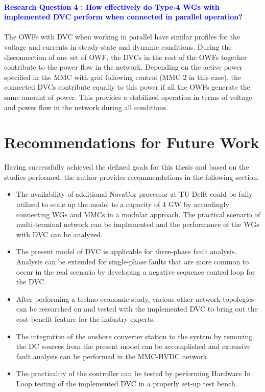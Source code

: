 \paragraph{\textcolor{blue}{Research Question 4 : How effectively do Type-4 \gls{WG}s with implemented \gls{DVC} perform when connected in parallel operation?}}

\paragraph{} The \gls{OWF}s with \gls{DVC} when working in parallel have similar profiles for the voltage and currents in steady-state and dynamic conditions. During the disconnection of one set of \gls{OWF}, the \gls{DVC}s in the rest of the \gls{OWF}s together contribute to the power flow in the network. Depending on the active power specified in the \gls{MMC} with grid following control (\gls{MMC}-2 in this case), the connected \gls{DVC}s contribute equally to this power if all the \gls{OWF}s generate the same amount of power. This provides a stabilized operation in terms of voltage and power flow in the network during all conditions.  

\section{Recommendations for Future Work}
Having successfully achieved the defined goals for this thesis and based on the studies performed, the author provides recommendations in the following section:  
\begin{itemize}
    \item The availability of additional NovaCor processor at TU Delft could be fully utilized to scale up the model to a capacity of 4 GW by accordingly connecting \gls{WG}s and \gls{MMC}s in a modular approach. The practical scenario of multi-terminal network can be implemented and the performance of the \gls{WG}s with \gls{DVC} can be analyzed.
    \item The present model of \gls{DVC} is applicable for three-phase fault analysis. Analysis can be extended for single-phase faults that are more common to occur in the real scenario by developing a negative sequence control loop for the \gls{DVC}.
    \item After performing a techno-economic study, various other network topologies can be researched on and tested with the implemented \gls{DVC} to bring out the cost-benefit feature for the industry experts. 
    \item The integration of the onshore converter station to the system by removing the \gls{DC} sources from the present model can be accomplished and extensive fault analysis can be performed in the \gls{MMC}-\gls{HVDC} network.
    \item The practicality of the controller can be tested by performing Hardware In Loop testing of the implemented \gls{DVC} in a properly set-up test bench.
\end{itemize}